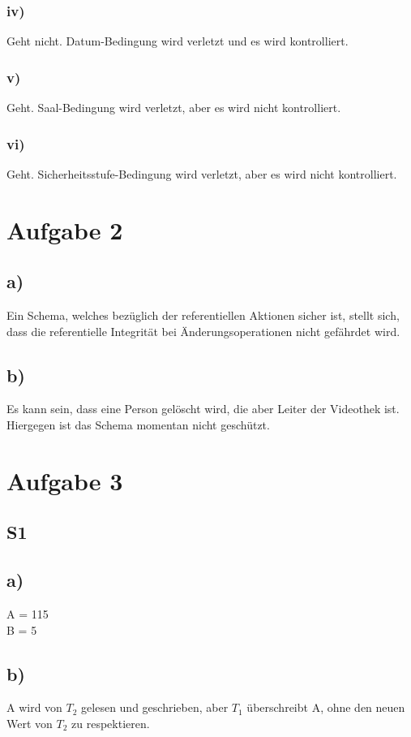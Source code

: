 \documentclass[a4paper,12pt,]{scrartcl}
\begin{document}
\subsubsection*{iv)}
Geht nicht. Datum-Bedingung wird verletzt und es wird kontrolliert.

\subsubsection*{v)}
Geht. Saal-Bedingung wird verletzt, aber es wird nicht kontrolliert.

\subsubsection*{vi)}
Geht. Sicherheitsstufe-Bedingung wird verletzt, aber es wird nicht kontrolliert.

\section*{Aufgabe 2}
\subsection*{a)}
Ein Schema, welches bezüglich der referentiellen Aktionen sicher ist,
stellt sich, dass die referentielle Integrität bei Änderungsoperationen
nicht gefährdet wird.

\subsection*{b)}
Es kann sein, dass eine Person gelöscht wird, die aber Leiter der Videothek ist. Hiergegen ist das Schema momentan nicht geschützt.

\section*{Aufgabe 3}
\subsection*{S1}
\subsection*{a)}
A = 115 \\
B = 5
\subsection*{b)}
A wird von \(T_2\) gelesen und geschrieben, aber \(T_1\) überschreibt A, ohne den neuen Wert von \(T_2\) zu respektieren.
\end{document}
